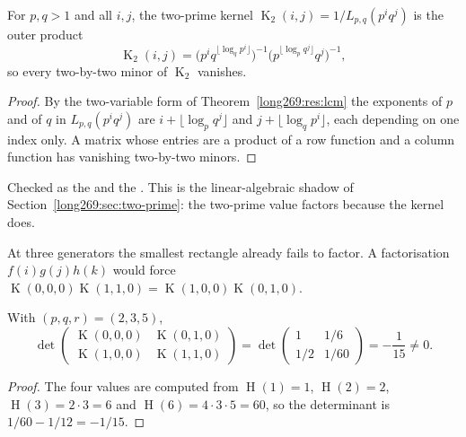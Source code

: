 \documentclass[11pt]{article}
\newcommand{\hgt}{\operatorname{H}}
\newcommand{\Kernel}{\operatorname{K}}
\begin{document}
\begin{proposition}\label{long269:res:two-prime-rank}
For $p,q>1$ and all $i,j$, the two-prime kernel
$\Kernel_2(i,j)=1/L_{p,q}(p^iq^j)$ is the outer product
\[
 \Kernel_2(i,j)
 =\bigl(p^{i}q^{\lfloor\log_q p^{i}\rfloor}\bigr)^{-1}
  \bigl(p^{\lfloor\log_p q^{j}\rfloor}q^{j}\bigr)^{-1},
\]
so every two-by-two minor of $\Kernel_2$ vanishes.
\end{proposition}

\begin{proof}
By the two-variable form of Theorem~\ref{long269:res:lcm} the exponents of $p$ and of
$q$ in $L_{p,q}(p^iq^j)$ are $i+\lfloor\log_p q^{j}\rfloor$ and
$j+\lfloor\log_q p^{i}\rfloor$, each depending on one index only.  A matrix
whose entries are a product of a row function and a column function has
vanishing two-by-two minors.
\end{proof}

\noindent Checked as the
 and the
.  This is the linear-algebraic shadow of
Section~\ref{long269:sec:two-prime}: the two-prime value factors because the kernel
does.

At three generators the smallest rectangle already fails to factor.  A
factorisation $f(i)g(j)h(k)$ would force
$\Kernel(0,0,0)\Kernel(1,1,0)=\Kernel(1,0,0)\Kernel(0,1,0)$.

\begin{proposition}\label{long269:res:rank}
With $(p,q,r)=(2,3,5)$,
\[
 \det\begin{pmatrix}
 \Kernel(0,0,0)&\Kernel(0,1,0)\\
 \Kernel(1,0,0)&\Kernel(1,1,0)
 \end{pmatrix}
 =\det\begin{pmatrix}1&1/6\\1/2&1/60\end{pmatrix}
 =-\frac1{15}\ne0 .
\]
\end{proposition}

\begin{proof}
The four values are computed from $\hgt(1)=1$, $\hgt(2)=2$,
$\hgt(3)=2\cdot3=6$ and $\hgt(6)=4\cdot3\cdot5=60$, so the determinant is
$1/60-1/12=-1/15$.
\end{proof}
\end{document}
